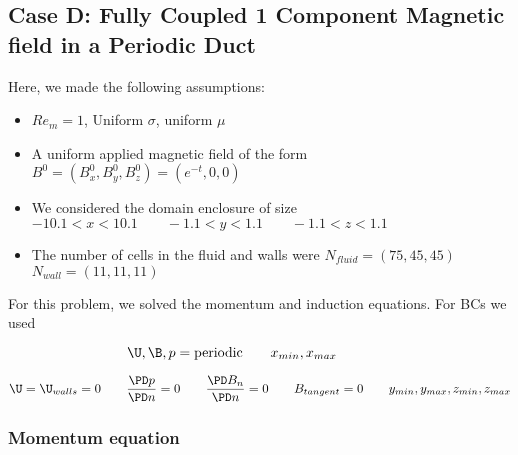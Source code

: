 \documentclass[11pt]{article}
\newcommand{\figS}{22.1em}
\newcommand{\figH}{\figS}
\newcommand{\figW}{\figS}
\begin{document}

\subsection{Case D: Fully Coupled 1 Component Magnetic field in a Periodic Duct}

Here, we made the following assumptions:

\begin{itemize}
\item $Re_m = 1$, Uniform $\sigma$, uniform $\mu$
\item A uniform applied magnetic field of the form $B^0 = (B_x^0,B_y^0,B_z^0) = (e^{-t},0,0)$
\item We considered the domain enclosure of size $-10.1 < x < 10.1 \qquad -1.1 < y < 1.1 \qquad -1.1 < z < 1.1$
\item The number of cells in the fluid and walls were $N_{fluid} = (75,45,45)$ \qquad $N_{wall} = (11,11,11)$
\end{itemize}

For this problem, we solved the momentum and induction equations. For BCs we used

\begin{equation}
	\U,
	\B,
	p = \text{periodic}
	\qquad
	x_{min},x_{max}
	\qquad \qquad
\end{equation}

\begin{equation}
	\U = \U_{walls} = 0
	\qquad
	\frac{\PD p}{\PD n} = 0
	\qquad
	\frac{\PD B_{n}}{\PD n} = 0
	\qquad
	B_{tangent} = 0
	\qquad
	y_{min},y_{max},
	z_{min},z_{max}
\end{equation}

\subsubsection{Momentum equation}
\end{document}
